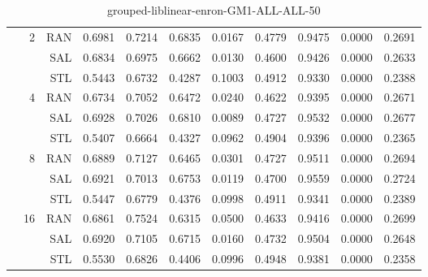 \begin{center}
\begin{table}[htbp]
\begin{center}
\begin{tabular}{ | r | r | r | r | r | r | r | r | r | r | r |}
 & \multirow{3}{*}{2} & RAN & 0.6981 & 0.7214 & 0.6835 & 0.0167 & 0.4779 & 0.9475 & 0.0000 & 0.2691\\ \cline{3-11}
 &   & SAL & 0.6834 & 0.6975 & 0.6662 & 0.0130 & 0.4600 & 0.9426 & 0.0000 & 0.2633\\ \cline{3-11}
 &   & STL & 0.5443 & 0.6732 & 0.4287 & 0.1003 & 0.4912 & 0.9330 & 0.0000 & 0.2388\\ \cline{2-11}
 & \multirow{3}{*}{4} & RAN & 0.6734 & 0.7052 & 0.6472 & 0.0240 & 0.4622 & 0.9395 & 0.0000 & 0.2671\\ \cline{3-11}
 &   & SAL & 0.6928 & 0.7026 & 0.6810 & 0.0089 & 0.4727 & 0.9532 & 0.0000 & 0.2677\\ \cline{3-11}
 &   & STL & 0.5407 & 0.6664 & 0.4327 & 0.0962 & 0.4904 & 0.9396 & 0.0000 & 0.2365\\ \cline{2-11}
 & \multirow{3}{*}{8} & RAN & 0.6889 & 0.7127 & 0.6465 & 0.0301 & 0.4727 & 0.9511 & 0.0000 & 0.2694\\ \cline{3-11}
 &   & SAL & 0.6921 & 0.7013 & 0.6753 & 0.0119 & 0.4700 & 0.9559 & 0.0000 & 0.2724\\ \cline{3-11}
 &   & STL & 0.5447 & 0.6779 & 0.4376 & 0.0998 & 0.4911 & 0.9341 & 0.0000 & 0.2389\\ \cline{2-11}
 & \multirow{3}{*}{16} & RAN & 0.6861 & 0.7524 & 0.6315 & 0.0500 & 0.4633 & 0.9416 & 0.0000 & 0.2699\\ \cline{3-11}
 &   & SAL & 0.6920 & 0.7105 & 0.6715 & 0.0160 & 0.4732 & 0.9504 & 0.0000 & 0.2648\\ \cline{3-11}
 &   & STL & 0.5530 & 0.6826 & 0.4406 & 0.0996 & 0.4948 & 0.9381 & 0.0000 & 0.2358\\ \cline{2-11}
\hline
\end{tabular}
\caption{grouped-liblinear-enron-GM1-ALL-ALL-50}
\end{center}
 \end{table}
\end{center}

